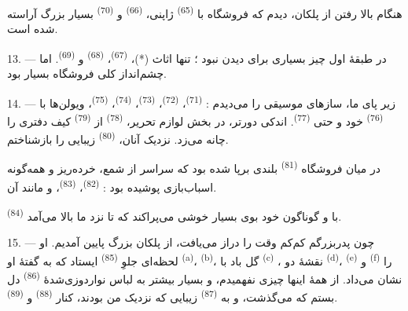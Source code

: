هنگام بالا رفتن از پلکان، دیدم که فروشگاه با 
\textsuperscript{(65)} ژاپنی، 
\textsuperscript{(66)} و  \textsuperscript{(70)} بسیار
بزرگ آراسته شده است.

13. --- در طبقهٔ اول چیز بسیاری برای دیدن نبود ؛ تنها اثاث (*)،
 \textsuperscript{(67)}، 
\textsuperscript{(68)} و  \textsuperscript{(69)}.
اما چشم‌انداز کلی فروشگاه بسیار  بود.

14. --- زیر پای ما، سازهای موسیقی را می‌دیدم : 
\textsuperscript{(71)}،  \textsuperscript{(72)}،
 \textsuperscript{(73)}، 
\textsuperscript{(74)}،  \textsuperscript{(75)}،
ویولن‌ها با  \textsuperscript{(76)} خود و حتی
 \textsuperscript{(77)}. اندکی دورتر، در بخش لوازم
تحریر،  \textsuperscript{(78)} از 
\textsuperscript{(79)} کیف دفتری را چانه می‌زد. نزدیک آنان،
 \textsuperscript{(80)} زیبایی را بازشناختم.

در میان فروشگاه  \textsuperscript{(81)} بلندی
برپا شده بود که سراسر از شمع، خرده‌ریز و همه‌گونه اسباب‌بازی پوشیده
بود :  \textsuperscript{(82)}، 
\textsuperscript{(83)}، و مانند آن.

 \textsuperscript{(84)} با  و
 گوناگون خود بوی بسیار خوشی می‌پراکند که تا نزد ما
بالا می‌آمد.

\VUsaut{3.4mm}
\VUsaut{2.8mm}

15. --- چون پدربزرگم کم‌کم وقت را دراز می‌یافت، از پلکان بزرگ پایین
آمدیم. او لحظه‌ای جلوِ  \textsuperscript{(85)}
ایستاد که به گفتهٔ او 
\textsuperscript{(a)}، 
\textsuperscript{(b)}، گل باد با 
\textsuperscript{(c)} ، نقشهٔ دو
 \textsuperscript{(d)}، 
\textsuperscript{(e)} و  \textsuperscript{(f)} را
نشان می‌داد. از همهٔ اینها چیزی نفهمیدم، و بسیار بیشتر به لباس
نواردوزی‌شدهٔ  \textsuperscript{(86)} دل بستم که
می‌گذشت، و به  \textsuperscript{(87)} زیبایی که
نزدیک من بودند، کنار  \textsuperscript{(88)} و
 \textsuperscript{(89)}.

